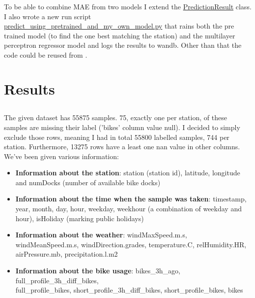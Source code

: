\documentclass[a4paper]{article}
\begin{document}
    To be able to combine MAE from two models I extend the \href{https://github.com/isabelladegen/mlp-2021/blob/fba40c1f27f066e1c5413c45a50c90a32a018f81/src/PredictionResult.py}{PredictionResult}
    class. I also wrote a new run script \href{https://github.com/isabelladegen/mlp-2021/blob/fba40c1f27f066e1c5413c45a50c90a32a018f81/src/predict_using_pretrained_and_my_own_model.py}{predict\_using\_pretrained\_and\_my\_own\_model.py}
    that rains both the pre trained model (to find the one best matching the station) and the multilayer perceptron regressor model
    and logs the results to wandb. Other than that the code could be reused from .




    \section{Results}\label{sec:results}
    \subsection*{}
    \subsubsection*{}
    The given dataset has 55875 samples. 75, exactly one per station, of these samples are missing their label ('bikes'
    column value null).
    I decided to simply exclude those rows, meaning I had in total 55800 labelled samples, 744 per station. Furthermore,
    13275 rows have a least one nan value in other columns.
    We've been given various information:
    \begin{itemize}
        \item \textbf{Information about the station}: station (station id), latitude, longitude and
        numDocks (number of available bike docks)
        \item \textbf{Information about the time when the sample was taken}: timestamp, year, month, day, hour,
        weekday, weekhour (a combination of weekday and hour), isHoliday (marking public holidays)
        \item \textbf{Information about the weather}: windMaxSpeed.m.s, windMeanSpeed.m.s,  windDirection.grades,
        temperature.C, relHumidity.HR, airPressure.mb, precipitation.l.m2
        \item \textbf{Information about the bike usage}: bikes\_3h\_ago,
        full\_profile\_3h\_diff\_bikes,\\
        full\_profile\_bikes, short\_profile\_3h\_diff\_bikes,
        short\_profile\_bikes, bikes
    \end{itemize}
\end{document}
